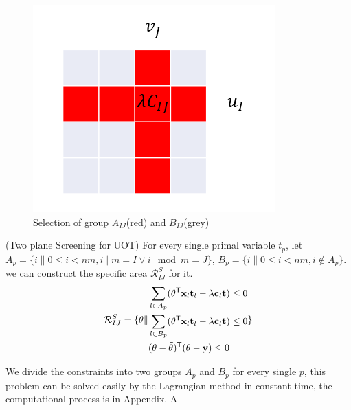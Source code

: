 	\begin{figure}[h]
	\begin{center}	
	\includegraphics[width = \linewidth]{pic/divide}
	\caption{Selection of group $A_{IJ}$(red) and $B_{IJ}$(grey)}
	\end{center}	
	\end{figure}

\begin{thm}\label{area}(Two plane Screening for UOT) For every single primal variable $t_p$, let $A_p = \{ i \| 0\leq i<nm, i\mid m = I \vee i\mod m = J\}$, $B_p = \{ i \| 0\leq i<nm, i \notin A_p\}$. we can construct the specific area $\mathcal{R}^{S}_{IJ}$ for it.
 \begin{equation}
\begin{split} 
\mathcal{R}^S_{IJ} = \{\theta \|
\begin{aligned}
 &\sum_{l\in A_p}(\theta^{\mathsf T}\mathbf{x}_{l}\mathbf{t}_l - \lambda \mathbf{c}_l \mathbf{t})\leq 0 \\
 &\sum_{l\in B_p}(\theta^{\mathsf T}\mathbf{x}_{l}\mathbf{t}_l - \lambda \mathbf{c}_l \mathbf{t})\leq 0 \\
  &(\theta-\tilde{\theta})^{\mathsf T}(\theta-\mathbf{y})\leq 0
\end{aligned}
\}
\end{split}
\label{eq:divide}
\end{equation}
\end{thm}
We divide the constraints into two groups $A_p$ and $B_p$ for every single $p$, this problem can be solved easily by the Lagrangian method in constant time, the computational process is in Appendix. A


